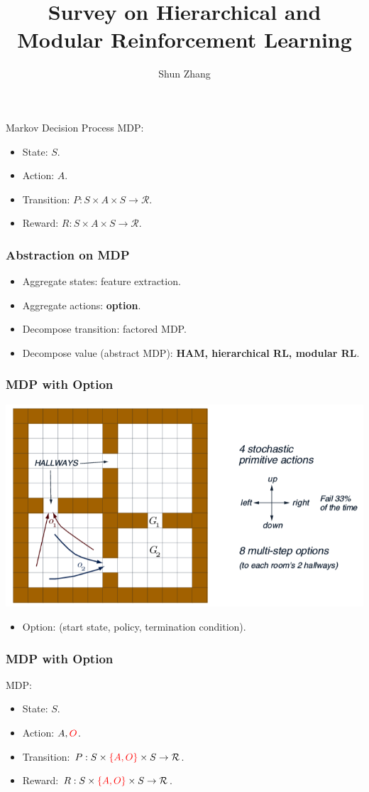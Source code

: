 \documentclass{beamer}
\title{Survey on Hierarchical and Modular Reinforcement Learning}
\author{Shun Zhang}
\begin{document}
\begin{frame}
\titlepage
\end{frame}

\begin{frame}{Markov Decision Process}
MDP:
\begin{itemize}
\item State: $S$.
\item Action: $A$.
\item Transition: $P: S \times A \times S \rightarrow \mathcal{R}$.
\item Reward: $R: S \times A \times S \rightarrow \mathcal{R}$.
\end{itemize}
\end{frame}

\begin{frame}
\frametitle{Abstraction on MDP}
\begin{itemize}
  \item Aggregate states: feature extraction. \pause
  \item Aggregate actions: {\bf option}. \pause
  \item Decompose transition: factored MDP. \pause
  \item Decompose value (abstract MDP): {\bf HAM, hierarchical RL, modular RL}.
\end{itemize}
\end{frame}

\begin{frame}
\frametitle{MDP with Option}
\includegraphics[width=0.8\columnwidth]{option.png}
\begin{itemize}
  \item Option: (start state, policy, termination condition).
\end{itemize}
\end{frame}

\begin{frame}
\frametitle{MDP with Option}
MDP:
\begin{itemize}
  \item State: $S$.
  \item Action: $A, {\color{red}O}$.
  \item Transition: $P: S \times {\color{red}\{A, O\}} \times S \rightarrow \mathcal{R}$.
  \item Reward: $R: S \times {\color{red}\{A, O\}} \times S \rightarrow \mathcal{R}$.
\end{itemize}
\end{frame}
\end{document}
